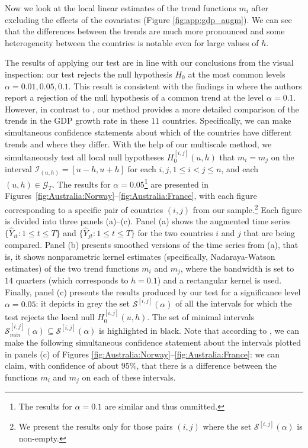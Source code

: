 \documentclass[a4paper,12pt]{article}
\makeatletter
\renewcommand{\eqref}[1]{\tagform@{\ref{#1}}}
\makeatother
\begin{document}
Now we look at the local linear estimates of the trend functions $m_i$ after excluding the effects of the covariates (Figure \ref{fig:app:gdp_augm}). We can see that the differences between the trends are much more pronounced and some heterogeneity between the countries is notable even for large values of $h$.

The results of applying our test are in line with our conclusions from the visual inspection: our test rejects the null hypothesis $H_0$ at the most common levels \linebreak$\alpha = 0.01, 0.05, 0.1$. This result is consistent with the findings in \cite{Zhang2012} where the authors report a rejection of the null hypothesis of a common trend at the level $\alpha = 0.1$. However, in contrast to \cite{Zhang2012}, our method provides a more detailed comparison of the trends in the GDP growth rate in these $11$ countries. Specifically, we can make simultaneous confidence statements about which of the countries have different trends and where they differ. With the help of our multiscale method, we simultaneously test all local null hypotheses $H_0^{[i, j]}(u, h)$ that $m_i = m_j$ on the interval $\mathcal{I}_{(u, h)} = [u-h, u+h]$ for each $i, j, 1 \le i < j \le n$, and each $(u, h) \in \mathcal{G}_T$. The results for $\alpha = 0.05$\footnote{The results for $\alpha = 0.1$ are similar and thus ommitted.} are presented in Figures~\ref{fig:Australia:Norway}--\ref{fig:Australia:France}, with each figure corresponding to a specific pair of countries $(i, j)$ from our sample.\footnote{We present the results only for those pairs $(i, j)$ where the set $\mathcal{S}^{[i, j]}(\alpha)$ is non-empty.} Each figure is divided into three panels (a)--(c).  Panel (a) shows the augmented time series $\{\widehat{Y}_{it}: 1 \le t \le T\}$ and $\{\widehat{Y}_{jt}: 1 \le t \le T\}$ for the two countries $i$ and $j$ that are being compared. Panel (b) presents smoothed versions of the time series from (a), that is, it shows nonparametric kernel estimates (specifically, Nadaraya-Watson estimates) of the two trend functions $m_i$ and $m_j$, where the bandwidth is set to $14$ quarters (which corresponds to $h = 0.1$) and a rectangular kernel is used. Finally, panel (c) presents the results produced by our test for a significance level $\alpha = 0.05$: it depicts in grey the set $\mathcal{S}^{[i, j]}(\alpha)$ of all the intervals for which the test rejects the local null $H_0^{[i, j]}(u, h)$. The set of minimal intervals $\mathcal{S}^{[i, j]}_{min}(\alpha) \subseteq \mathcal{S}^{[i, j]}(\alpha)$ is highlighted in black. Note that according to \eqref{corollary1}, we can make the following simultaneous confidence statement about the intervals plotted in panels (c) of Figures \ref{fig:Australia:Norway}--\ref{fig:Australia:France}: we can claim, with confidence of about $95\%$, that there is a difference between the functions $m_i$ and $m_j$ on each of these intervals. 
\end{document}
